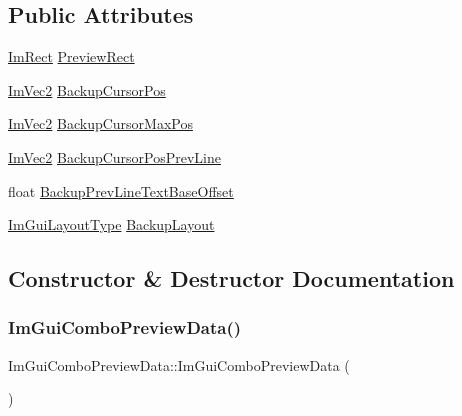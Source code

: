 \subsection*{Public Attributes}
\begin{DoxyCompactItemize}
\item 
\hyperlink{structImRect}{Im\+Rect} \hyperlink{structImGuiComboPreviewData_a1a3c9147f5b869275d7a6d51fd6c9ba2}{Preview\+Rect}
\item 
\hyperlink{structImVec2}{Im\+Vec2} \hyperlink{structImGuiComboPreviewData_a590261014878e7fd5ef3926ed4877d06}{Backup\+Cursor\+Pos}
\item 
\hyperlink{structImVec2}{Im\+Vec2} \hyperlink{structImGuiComboPreviewData_af0bb3913110d97fa885b1c0062b5a224}{Backup\+Cursor\+Max\+Pos}
\item 
\hyperlink{structImVec2}{Im\+Vec2} \hyperlink{structImGuiComboPreviewData_a4953f30f667c2988a54f627bd36523af}{Backup\+Cursor\+Pos\+Prev\+Line}
\item 
float \hyperlink{structImGuiComboPreviewData_a5563d91e33a46488ba26d2cfc5576bb4}{Backup\+Prev\+Line\+Text\+Base\+Offset}
\item 
\hyperlink{imgui__internal_8h_a86d7bb2ee8297d38b131d8ea7e6430c6}{Im\+Gui\+Layout\+Type} \hyperlink{structImGuiComboPreviewData_a0f923b567fb82135b4980c4a5e9ea0ab}{Backup\+Layout}
\end{DoxyCompactItemize}


\subsection{Constructor \& Destructor Documentation}
\mbox{\label{structImGuiComboPreviewData_a52eb1c065997a765a30d18ad369e7c2c}} 
\subsubsection{\texorpdfstring{Im\+Gui\+Combo\+Preview\+Data()}{ImGuiComboPreviewData()}}
{\footnotesize\ttfamily Im\+Gui\+Combo\+Preview\+Data\+::\+Im\+Gui\+Combo\+Preview\+Data (\begin{DoxyParamCaption}{ }\end{DoxyParamCaption})\hspace{0.3cm}{\ttfamily [inline]}}



